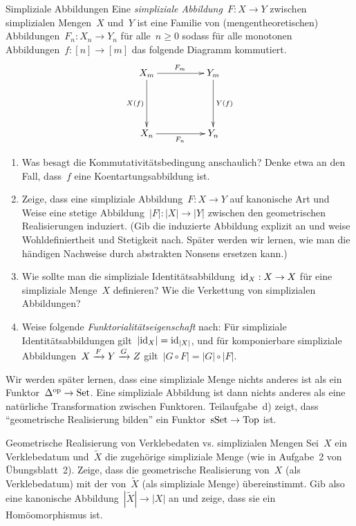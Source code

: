 \documentclass{uebblatt}
\begin{document}

\begin{aufgabe}{Simpliziale Abbildungen}
Eine \emph{simpliziale Abbildung}~$F : X \to Y$ zwischen simplizialen
Mengen~$X$ und~$Y$ ist eine Familie von (mengentheoretischen) Abbildungen~$F_n
: X_n \to Y_n$ für alle~$n \geq 0$ sodass für alle monotonen Abbildungen~$f :
[n] \to [m]$ das folgende Diagramm kommutiert.
\[ \xymatrixcolsep{4pc}\xymatrixrowsep{4pc}\xymatrix{
  X_m \ar[r]^{F_m} \ar[d]_{X(f)} & Y_m \ar[d]^{Y(f)} \\
  X_n \ar[r]_{F_n} & Y_n
} \]

\begin{enumerate}
\item Was besagt die Kommutativitätsbedingung anschaulich? Denke etwa an den
Fall, dass~$f$ eine Koentartungsabbildung ist.
\item Zeige, dass eine simpliziale Abbildung~$F : X \to Y$ auf kanonische Art
und Weise eine stetige Abbildung~$|F| : |X| \to |Y|$ zwischen den geometrischen
Realisierungen induziert. (Gib die induzierte Abbildung explizit an und weise
Wohldefiniertheit und Stetigkeit nach. Später werden wir lernen, wie man die
händigen Nachweise durch abstrakten Nonsens ersetzen kann.)
\item Wie sollte man die simpliziale Identitätsabbildung~$\mathrm{id}_X : X \to X$ für
eine simpliziale Menge~$X$ definieren? Wie die Verkettung von simplizialen
Abbildungen?
\item Weise folgende \emph{Funktorialitätseigenschaft} nach: Für
simpliziale Identitätsabbildungen gilt~$|\mathrm{id}_X| = \mathrm{id}_{|X|}$, und für
komponierbare simpliziale Abbildungen~$X \xrightarrow{F} Y \xrightarrow{G} Z$ gilt~$|G \circ F|
= |G| \circ |F|$.
\end{enumerate}

Wir werden später lernen, dass eine simpliziale Menge nichts anderes ist als
ein Funktor~$\Delta^{\mathrm{op}} \to \mathrm{Set}$. Eine simpliziale Abbildung ist dann nichts
anderes als eine natürliche Transformation zwischen Funktoren. Teilaufgabe~d)
zeigt, dass "`geometrische Realisierung bilden"' ein Funktor~$\mathrm{sSet} \to \mathrm{Top}$
ist.
\end{aufgabe}

\begin{aufgabe}{Geometrische Realisierung von Verklebedaten vs. simplizialen Mengen}
Sei~$X$ ein Verklebedatum und~$\widetilde X$ die zugehörige simpliziale Menge
(wie in Aufgabe~2 von Übungsblatt~2). Zeige, dass die geometrische
Realisierung von~$X$ (als Verklebedatum) mit der von~$\widetilde X$ (als
simpliziale Menge) übereinstimmt. Gib also eine kanonische
Abbildung~$|\widetilde X| \to |X|$ an und zeige, dass sie ein Homöomorphismus
ist.
\end{aufgabe}
\end{document}

